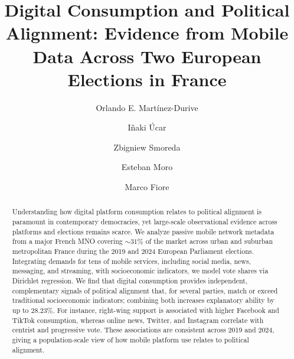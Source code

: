 \documentclass[9pt,sigconf,letterpaper]{acmart}
\begin{document}
\title[Digital Consumption and Political Alignment: Evidence from Mobile Data Across Two European Elections in France]{Digital Consumption and Political Alignment: Evidence from Mobile Data Across Two European Elections in France}

\author{Orlando E. Mart\'inez-Durive}

\author{I\~naki \'Ucar}

\author{Zbigniew Smoreda}

\author{Esteban Moro}

\author{Marco Fiore}

\begin{abstract}
Understanding how digital platform consumption relates to political alignment is paramount in contemporary democracies, yet large-scale observational evidence across platforms and elections remains scarce.
We analyze passive mobile network metadata from a major French \ac{MNO} covering ${\sim}31\%$ of the market across urban and suburban metropolitan France during the 2019 and 2024 European Parliament elections.
Integrating demands for tens of mobile services, including social media, news, messaging, and streaming, with socioeconomic indicators, we model vote shares via Dirichlet regression.
We find that digital consumption provides independent, complementary signals of political alignment that, for several parties, match or exceed traditional socioeconomic indicators; combining both increases explanatory ability by up to $28.23\%$.
For instance, right-wing support is associated with higher Facebook and TikTok consumption, whereas online news, Twitter, and Instagram correlate with centrist and progressive vote.
These associations are consistent across 2019 and 2024, giving a population-scale view of how mobile platform use relates to political alignment.
\end{abstract}
\end{document}
